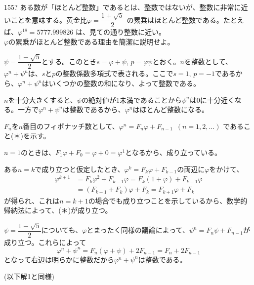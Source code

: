 \begin{thm}{155}{\hosi ?}{}
 ある数が「ほとんど整数」であるとは、整数ではないが、整数に非常に近いことを意味する。黄金比$\varphi=\dfrac{1+\sqrt{5}}{2}$ の累乗はほとんど整数である。たとえば、$\varphi^{18}=5777.999826$ は、見ての通り整数に近い。 \\
 $\varphi$の累乗がほとんど整数である理由を簡潔に説明せよ。
\end{thm}

$\psi=\dfrac{1-\sqrt{5}}{2}$とする。このとき$s=\varphi+\psi$, $p=\varphi\psi$とおく。$n$を整数として、$\varphi^n+\psi^n$は、$s$と$p$の整数係数多項式で表される。ここで$s=1$, $p=-1$であるから、$\varphi^n+\psi^n$はいくつかの整数の和になり、よって整数である。

$n$を十分大きくすると、$\psi$の絶対値が1未満であることから$\psi^n$は0に十分近くなる。一方で$\varphi^n+\psi^n$は整数であるから、$\varphi^n$はほとんど整数になる。

$F_n$を$n$番目のフィボナッチ数として、$\varphi^n=F_n\varphi+F_{n-1}$~$(n=1,2,\dots)$ であること(＊)を示す。

$n=1$のときは、$F_1\varphi+F_0=\varphi+0=\varphi^1$となるから、成り立っている。

ある$n=k$で成り立つと仮定したとき、$\varphi^k=F_k\varphi+F_{k-1}$の両辺に$\varphi$をかけて、
\begin{align*}
 \varphi^{k+1}&=F_k\varphi^2+F_{k-1}\varphi=F_k(1+\varphi)+F_{k-1}\varphi \\
 &= (F_{k-1}+F_k)\varphi+F_k=F_{k+1}\varphi+F_k
\end{align*}
が得られ、これは$n=k+1$の場合でも成り立つことを示しているから、数学的帰納法によって、(＊)が成り立つ。

$\psi=\dfrac{1-\sqrt{5}}{2}$についても、$\varphi$とまったく同様の議論によって、$\psi^n=F_n\psi+F_{n-1}$が成り立つ。これらによって
\[ \varphi^n+\psi^n=F_n(\varphi+\psi)+2F_{n-1}=F_n+2F_{n-1} \]
となって右辺は明らかに整数だから$\varphi^n+\psi^n$は整数である。

(以下解1と同様)